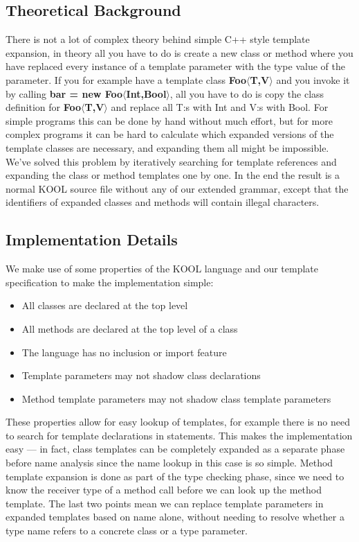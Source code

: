 \subsection{Theoretical Background}

There is not a lot of complex theory behind simple C++ style template expansion, in theory all you
have to do is create a new class or method where you have replaced every instance of a template
parameter with the type value of the parameter.  If you for example have a template class
\textbf{Foo$\langle$T,V$\rangle$} and you invoke it by calling \textbf{bar = new
Foo$\langle$Int,Bool$\rangle$}, all you have to do is copy the class definition for
\textbf{Foo$\langle$T,V$\rangle$} and replace all T:s with Int and V:s with Bool. For simple
programs this can be done by hand without much effort, but for more complex programs it can be hard
to calculate which expanded versions of the template classes are necessary, and expanding them all
might be impossible. We've solved this problem by iteratively searching for template references and
expanding the class or method templates one by one. In the end the result is a normal KOOL source
file without any of our extended grammar, except that the identifiers of expanded classes and
methods will contain illegal characters.

\subsection{Implementation Details}

We make use of some properties of the KOOL language and our template specification to make the
implementation simple:

\begin{itemize}
    \item All classes are declared at the top level
    \item All methods are declared at the top level of a class
    \item The language has no inclusion or import feature
    \item Template parameters may not shadow class declarations
    \item Method template parameters may not shadow class template parameters
\end{itemize}

These properties allow for easy lookup of templates, for example there is no need to search
for template declarations in statements. This makes the implementation easy --- in fact, class
templates can be completely expanded as a separate phase before name analysis since the name lookup
in this case is so simple. Method template expansion is done as part of the type checking phase,
since we need to know the receiver type of a method call before we can look up the method template.
The last two points mean we can replace template parameters in expanded templates based on name
alone, without needing to resolve whether a type name refers to a concrete class or a type
parameter.

